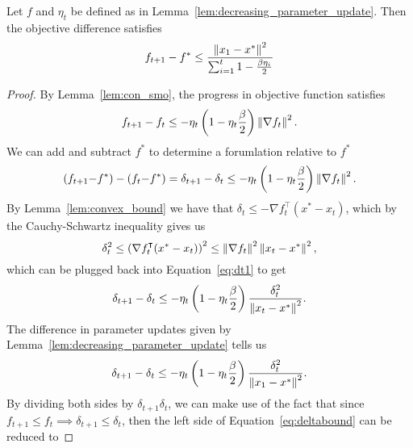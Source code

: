 \begin{theorem}
    \label{thm:beta_update}
    Let $f$ and $\eta_t$ be defined as in
    Lemma~\ref{lem:decreasing_parameter_update}. Then the objective difference
    satisfies
    \begin{equation}
        f_{t+1} - f^* \leq  \frac{\left\| x_1 - x^* \right\|^2}{\sum_{i = 1}^t 1 - \frac{\beta\eta_i}{2}}
    \end{equation}
\end{theorem}


\begin{proof}
    By Lemma~\ref{lem:con_smo}, the progress in objective function satisfies
    \begin{equation}
        \label{eq:con_smo_begin}
        f_{t+1} - f_t \leq -\eta_t \left( 1 - \eta_t \frac{\beta}{2}
        \right)\left\| \nabla f_t \right\|^2.
    \end{equation}
    We can add and subtract $f^*$ to determine a 
    forumlation relative to $f^*$
    \begin{equation}
        (f_{t+1} {- f^*}) - (f_t {- f^*}) = \delta_{t+1} - \delta_t \leq -\eta_t \left( 1 - \eta_t \frac{\beta}{2}
        \right)\left\| \nabla f_t \right\|^2.
    \end{equation}
    By Lemma~\ref{lem:convex_bound} we have that  $ \delta_t \leq
    -\nabla f_t^\intercal (x^* - x_t)$,
    which by the Cauchy-Schwartz inequality gives us
    \begin{equation}
        \delta_t^2 \leq {\left(\nabla f_t^\intercal (x^* - x_t)\right)}^2 \leq
        \left\| \nabla f_t \right\|^2\left\| x_t - x^* \right\|^2,
    \end{equation}
    which can be plugged back into Equation~\ref{eq:dt1} to get
    \begin{equation}
        \delta_{t+1} - \delta_t \leq -\eta_t \left( 1 - \eta_t \frac{\beta}{2}
        \right) { \frac{\delta_t^2}{\left\| x_t - x^* \right\|^2}}.
    \end{equation}
    The difference in parameter updates given by
    Lemma~\ref{lem:decreasing_parameter_update} tells us 
    \begin{equation}
        \label{eq:deltabound}
        \delta_{t+1} - \delta_t \leq -\eta_t \left( 1 - \eta_t \frac{\beta}{2}
        \right) \frac{\delta_t^2}{ \left\| x_1 - x^* \right\|^2}.
    \end{equation}
    By dividing both sides by $\delta_{t + 1}\delta_t$, we can make use of the
    fact that since $f_{t+1} \leq f_t \implies \delta_{t+1} \leq \delta_t$, then
    the left side of Equation~\ref{eq:deltabound}  can be reduced to

\end{proof}
